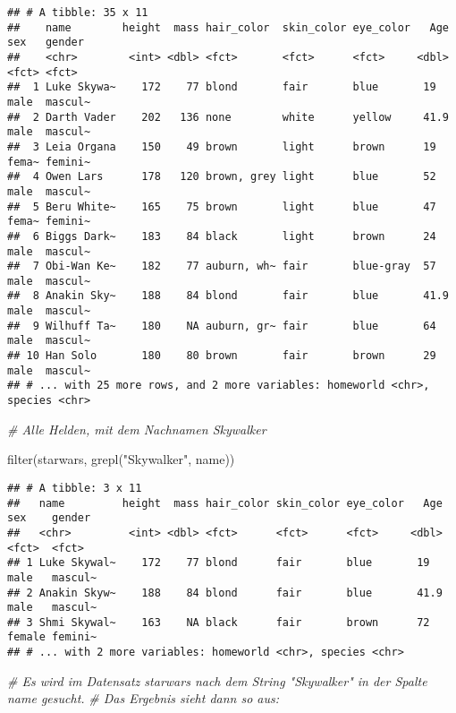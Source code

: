 \documentclass[
]{book}
\newenvironment{Shaded}{\begin{snugshade}}{\end{snugshade}}
\newcommand{\CommentTok}[1]{\textcolor[rgb]{0.56,0.35,0.01}{\textit{#1}}}
\newcommand{\FunctionTok}[1]{\textcolor[rgb]{0.00,0.00,0.00}{#1}}
\newcommand{\NormalTok}[1]{#1}
\newcommand{\StringTok}[1]{\textcolor[rgb]{0.31,0.60,0.02}{#1}}
\theoremstyle{definition}
\theoremstyle{definition}
\theoremstyle{definition}
\theoremstyle{definition}
\theoremstyle{remark}
\begin{document}
\begin{verbatim}
## # A tibble: 35 x 11
##    name        height  mass hair_color  skin_color eye_color   Age sex   gender 
##    <chr>        <int> <dbl> <fct>       <fct>      <fct>     <dbl> <fct> <fct>  
##  1 Luke Skywa~    172    77 blond       fair       blue       19   male  mascul~
##  2 Darth Vader    202   136 none        white      yellow     41.9 male  mascul~
##  3 Leia Organa    150    49 brown       light      brown      19   fema~ femini~
##  4 Owen Lars      178   120 brown, grey light      blue       52   male  mascul~
##  5 Beru White~    165    75 brown       light      blue       47   fema~ femini~
##  6 Biggs Dark~    183    84 black       light      brown      24   male  mascul~
##  7 Obi-Wan Ke~    182    77 auburn, wh~ fair       blue-gray  57   male  mascul~
##  8 Anakin Sky~    188    84 blond       fair       blue       41.9 male  mascul~
##  9 Wilhuff Ta~    180    NA auburn, gr~ fair       blue       64   male  mascul~
## 10 Han Solo       180    80 brown       fair       brown      29   male  mascul~
## # ... with 25 more rows, and 2 more variables: homeworld <chr>, species <chr>
\end{verbatim}

\begin{Shaded}
\begin{Highlighting}[]
\CommentTok{\# Alle Helden, mit dem Nachnamen Skywalker}

\FunctionTok{filter}\NormalTok{(starwars, }\FunctionTok{grepl}\NormalTok{(}\StringTok{"Skywalker"}\NormalTok{, name))}
\end{Highlighting}
\end{Shaded}

\begin{verbatim}
## # A tibble: 3 x 11
##   name         height  mass hair_color skin_color eye_color   Age sex    gender 
##   <chr>         <int> <dbl> <fct>      <fct>      <fct>     <dbl> <fct>  <fct>  
## 1 Luke Skywal~    172    77 blond      fair       blue       19   male   mascul~
## 2 Anakin Skyw~    188    84 blond      fair       blue       41.9 male   mascul~
## 3 Shmi Skywal~    163    NA black      fair       brown      72   female femini~
## # ... with 2 more variables: homeworld <chr>, species <chr>
\end{verbatim}

\begin{Shaded}
\begin{Highlighting}[]
\CommentTok{\# Es wird im Datensatz starwars nach dem String "Skywalker" in der Spalte name gesucht. }
\CommentTok{\# Das Ergebnis sieht dann so aus: }
\end{Highlighting}
\end{Shaded}
\end{document}
